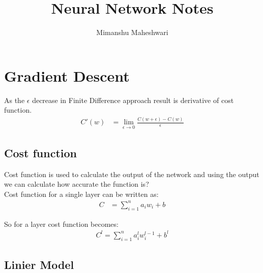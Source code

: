 \documentclass{article}
\begin{document}
\title{Neural Network Notes}
\author{Mimanshu Maheshwari}


\section{Gradient Descent}
As the $\epsilon$ decrease in Finite Difference approach result is derivative of cost function.
\begin{align}
	C'(w) &= \lim_{\epsilon \to 0}\frac{C(w + \epsilon) - C(w)}{\epsilon}
\end{align}

\subsection{Cost function}
Cost function is used to calculate the output of the network and using the output we can calculate how accurate the function is? \\
Cost function for a single layer can be written as:
\begin{align}
	C &= \sum_{i = 1}^{n}{a_iw_i + b}
\end{align}

So for a layer cost function becomes: 
\begin{align}
	C^{l} = \sum_{i = 1}^{n}{a_{i}^{l}w_{i}^{l - 1} + b^{l}}
\end{align}

\subsection{Linier Model}
\end{document}

